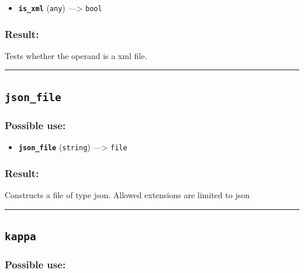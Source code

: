 \documentclass[]{book}
\providecommand{\tightlist}{%
  \setlength{\itemsep}{0pt}\setlength{\parskip}{0pt}}
\theoremstyle{definition}
\theoremstyle{definition}
\theoremstyle{definition}
\theoremstyle{remark}
\begin{document}
\begin{itemize}
\tightlist
\item
  \textbf{\texttt{is\_xml}} (\texttt{any}) ---\textgreater{}
  \texttt{bool}
\end{itemize}

\subsubsection{Result:}\label{result-299}

Tests whether the operand is a xml file.

\begin{center}\rule{0.5\linewidth}{\linethickness}\end{center}

\subsection{\texorpdfstring{\texttt{json\_file}}{json\_file}}\label{json_file}

\subsubsection{Possible use:}\label{possible-use-310}

\begin{itemize}
\tightlist
\item
  \textbf{\texttt{json\_file}} (\texttt{string}) ---\textgreater{}
  \texttt{file}
\end{itemize}

\subsubsection{Result:}\label{result-300}

Constructs a file of type json. Allowed extensions are limited to json

\begin{center}\rule{0.5\linewidth}{\linethickness}\end{center}

\subsection{\texorpdfstring{\texttt{kappa}}{kappa}}\label{kappa}

\subsubsection{Possible use:}\label{possible-use-311}
\end{document}

